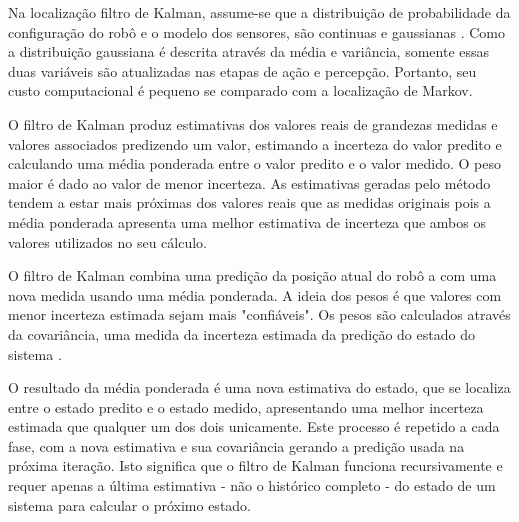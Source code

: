 
 Na localização filtro de Kalman, assume-se que a distribuição de probabilidade da configuração do robô e o modelo dos sensores,
 são continuas e gaussianas \cite{localization2}. Como a distribuição gaussiana é descrita através da média e variância, somente essas duas variáveis 
 são atualizadas nas etapas de ação e percepção. Portanto, seu custo computacional é pequeno se comparado com a localização de Markov.
 
O filtro de Kalman produz estimativas dos valores reais de grandezas medidas e valores associados predizendo um valor, 
estimando a incerteza do valor predito e calculando uma média ponderada entre o valor predito e o valor medido. 
O peso maior é dado ao valor de menor incerteza. As estimativas geradas pelo método tendem a estar mais próximas dos 
valores reais que as medidas originais pois a média ponderada apresenta uma melhor estimativa de incerteza que ambos os valores utilizados no seu cálculo.

 
  
O filtro de Kalman combina uma predição da posição atual do robô a com uma nova medida usando uma média ponderada. 
A ideia dos pesos é que valores com menor incerteza estimada sejam mais "confiáveis". 
Os pesos são calculados através da covariância, uma medida da incerteza estimada da predição do estado do sistema \cite{slam4}. 

O resultado da média ponderada é uma nova estimativa do estado, que se localiza entre o estado predito e o estado medido, 
apresentando uma melhor incerteza estimada que qualquer um dos dois unicamente. 
Este processo é repetido a cada fase, com a nova estimativa e sua covariância gerando a predição usada na próxima iteração. 
Isto significa que o filtro de Kalman funciona recursivamente e requer apenas a 
última estimativa - não o histórico completo - do estado de um sistema para calcular o próximo estado\cite{localization2}.
 
